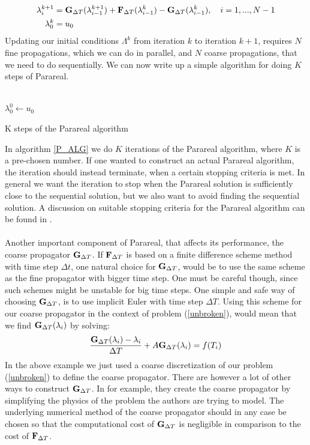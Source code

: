 \begin{align}
\lambda_{i}^{k+1} &= \bold G_ {\Delta T}(\lambda_{i-1}^{k+1})+\bold F_ {\Delta T}( \lambda_{i-1}^{k})-\bold G_ {\Delta T}( \lambda_{i-1}^{k}), \quad i=1,...,N-1 \label{pred_corr_PR} \\
\lambda_0^k &= u_0
\end{align}
Updating our initial conditions $\Lambda^k$ from iteration $k$ to iteration $k+1$, requires $N$ fine propagations, which we can do in parallel, and $N$ coarse propagations, that we need to do sequentially. We can now write up a simple algorithm for doing $K$ steps of Parareal.
\\
\\
\begin{algorithm}[H]
$\lambda^0_0\leftarrow u_0$\;
\caption{K steps of the Parareal algorithm\label{P_ALG}}
\end{algorithm}
\noindent
In algorithm \ref{P_ALG} we do $K$ iterations of the Parareal algorithm, where $K$ is a pre-chosen number. If one wanted to construct an actual Parareal algorithm, the iteration should instead terminate, when a certain stopping criteria is met. In general we want the iteration to stop when the Parareal solution is sufficiently close to the sequential solution, but we also want to avoid finding the sequential solution. A discussion on suitable stopping criteria for the Parareal algorithm can be found in \cite{lepsa2010efficient}.
\\
\\
Another important component of Parareal, that affects its performance, the coarse propagator $\bold G_{\Delta T}$. If $\bold F_{\Delta T}$ is based on a finite difference scheme method with time step $\Delta t$, one natural choice for $\bold G_{\Delta T}$, would be to use the same scheme as the fine propagator with bigger time step. One must be careful though, since such schemes might be unstable for big time steps. One simple and safe way of choosing $\bold G_{\Delta T}$, is to use implicit Euler with time step $\Delta T$. Using this scheme for our coarse propagator in the context of problem (\ref{unbroken}), would mean that we find $\bold{G}_{\Delta T}(\lambda_i)$ by solving:
\begin{align}
\frac{\bold{G}_{\Delta T}(\lambda_i) -\lambda_i }{\Delta T } + A \bold{G}_{\Delta T}(\lambda_i) = f(T_{i}) \label{G_Backward}
\end{align}
In the above example we just used a coarse discretization of our problem (\ref{unbroken}) to define the coarse propagator. There are however a lot of other ways to construct $\bold{G}_{\Delta T}$. In \cite{baffico2002parallel} for example, they create the coarse propagator by simplifying the physics of the problem the authors are trying to model. The underlying numerical method of the coarse propagator should in any case be chosen so that the computational cost of $\bold{G}_{\Delta T}$ is negligible in comparison to the cost of  $\bold{F}_{\Delta T}$.
